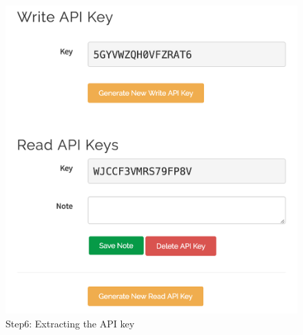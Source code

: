 \documentclass[conference]{IEEEtran}
\begin{document}
\begin{figure}[H]
\begin{center}
    \includegraphics[scale=0.4]{step61}
    \caption{Step6: Extracting the API key} \label{fig:label}
\end{center}
\end{figure}
\end{document}
